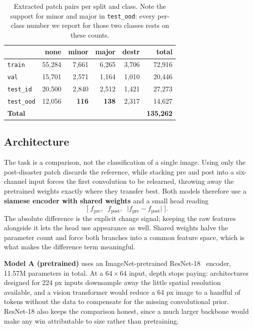 \documentclass[10pt,twocolumn]{article}
\newcommand{\class}[1]{\textsf{#1}}
\begin{document}
\begin{table}[t]
\centering
\footnotesize
\caption{Extracted patch pairs per split and class. Note the support for \class{minor} and
\class{major} in \texttt{test\_ood}: every per-class number we report for those two classes rests on
these counts.}
\label{tab:patches}
\begin{tabular}{@{}lrrrrr@{}}
\toprule
& \class{none} & \class{minor} & \class{major} & \class{destr} & \textbf{total} \\
\midrule
\texttt{train}     & 55,284 & 7,661 & 6,265 & 3,706 & 72,916 \\
\texttt{val}       & 15,701 & 2,571 & 1,164 & 1,010 & 20,446 \\
\texttt{test\_id}  & 20,500 & 2,840 & 2,512 & 1,421 & 27,273 \\
\texttt{test\_ood} & 12,056 & \textbf{116} & \textbf{138} & 2,317 & 14,627 \\
\midrule
\textbf{Total}     & & & & & \textbf{135,262} \\
\bottomrule
\end{tabular}
\end{table}

\subsection{Architecture}
\label{sec:arch}

The task is a comparison, not the classification of a single image. Using only the post-disaster
patch discards the reference, while stacking pre and post into a six-channel input forces the first
convolution to be relearned, throwing away the pretrained weights exactly where they transfer best.
Both models therefore use a \textbf{siamese encoder with shared weights} and a small head reading
\[
\big[\;f_{\text{pre}},\;\; f_{\text{post}},\;\; \lvert f_{\text{pre}} - f_{\text{post}}\rvert\;\big].
\]
The absolute difference is the explicit change signal; keeping the raw features alongside it lets the
head use appearance as well. Shared weights halve the parameter count and force both branches into a
common feature space, which is what makes the difference term meaningful.

\textbf{Model A (pretrained)} uses an ImageNet-pretrained ResNet-18~\cite{resnet,imagenet} encoder,
11.57M parameters in total. At a $64\times64$ input, depth stops paying: architectures designed for
224 px inputs downsample away the little spatial resolution available, and a vision transformer would
reduce a 64 px image to a handful of tokens without the data to compensate for the missing
convolutional prior. ResNet-18 also keeps the comparison honest, since a much larger backbone would
make any win attributable to size rather than pretraining.
\end{document}
